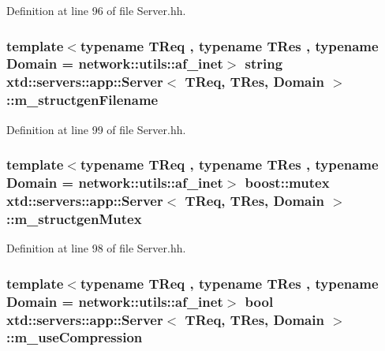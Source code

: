 Definition at line 96 of file Server.\+hh.

\subsubsection[{\texorpdfstring{m\+\_\+structgen\+Filename}{m_structgenFilename}}]{\setlength{\rightskip}{0pt plus 5cm}template$<$typename T\+Req , typename T\+Res , typename Domain  = network\+::utils\+::af\+\_\+inet$>$ string {\bf xtd\+::servers\+::app\+::\+Server}$<$ T\+Req, T\+Res, Domain $>$\+::m\+\_\+structgen\+Filename\hspace{0.3cm}{\ttfamily [protected]}}\hypertarget{classxtd_1_1servers_1_1app_1_1Server_a66a9242f7a55a296f1ca25cb18764eec}{}\label{classxtd_1_1servers_1_1app_1_1Server_a66a9242f7a55a296f1ca25cb18764eec}


Definition at line 99 of file Server.\+hh.

\subsubsection[{\texorpdfstring{m\+\_\+structgen\+Mutex}{m_structgenMutex}}]{\setlength{\rightskip}{0pt plus 5cm}template$<$typename T\+Req , typename T\+Res , typename Domain  = network\+::utils\+::af\+\_\+inet$>$ boost\+::mutex {\bf xtd\+::servers\+::app\+::\+Server}$<$ T\+Req, T\+Res, Domain $>$\+::m\+\_\+structgen\+Mutex\hspace{0.3cm}{\ttfamily [protected]}}\hypertarget{classxtd_1_1servers_1_1app_1_1Server_a3ad929be560e47d7193da946cd74e557}{}\label{classxtd_1_1servers_1_1app_1_1Server_a3ad929be560e47d7193da946cd74e557}


Definition at line 98 of file Server.\+hh.

\subsubsection[{\texorpdfstring{m\+\_\+use\+Compression}{m_useCompression}}]{\setlength{\rightskip}{0pt plus 5cm}template$<$typename T\+Req , typename T\+Res , typename Domain  = network\+::utils\+::af\+\_\+inet$>$ bool {\bf xtd\+::servers\+::app\+::\+Server}$<$ T\+Req, T\+Res, Domain $>$\+::m\+\_\+use\+Compression\hspace{0.3cm}{\ttfamily [protected]}}\hypertarget{classxtd_1_1servers_1_1app_1_1Server_a143d0eeee15dd57ba4d03737a0128551}{}\label{classxtd_1_1servers_1_1app_1_1Server_a143d0eeee15dd57ba4d03737a0128551}


